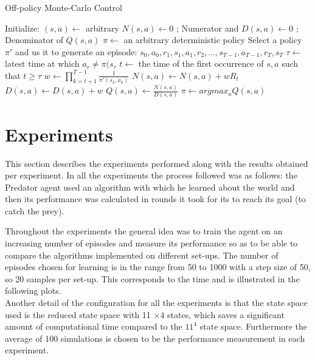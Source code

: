 \documentclass[11pt]{article}
\begin{document}
\begin{algorithm}
\caption{Off-policy Monte-Carlo Control}
\begin{algorithmic}[1]
\label{offpmc}
\STATE Initialize:
\STATE $(s,a) \leftarrow$ arbitrary
\STATE $N(s,a) \leftarrow 0$ \hspace{20mm} ; Numerator and
\STATE $D(s,a) \leftarrow 0$ \hspace{20mm} ; Denominator of $Q(s,a)$
\STATE $\pi \leftarrow$ an arbitrary deterministic policy
\LOOP
\STATE Select a policy $\pi'$ and us it to generate an episode:
\STATE \hspace{20mm} $s_0,a_0,r_1,s_1,a_1,r_2,...,s_{T-1},a_{T-1},r_T,s_T$
\STATE $\tau \leftarrow $ latest time at which $a_r \neq \pi(s_{\tau}$
\STATE $t \leftarrow$ the time of the first occurrence of $s,a$ such that $t \ge \tau$
\STATE $w \leftarrow \prod_{k=t+1}^{T-1} \frac{1}{\pi'(s_k,a_k)}$
\STATE $N(s,a) \leftarrow N(s,a) + wR_t$
\STATE $D(s,a) \leftarrow D(s,a) + w$
\STATE $Q(s,a) \leftarrow \frac{N(s,a)}{D(s,a)}$
\ENDFOR
{}
\STATE $\pi \leftarrow argmax_aQ(s,a)$
\ENDFOR
\ENDLOOP
\ENDFOR
\end{algorithmic}
\end{algorithm}

\section{Experiments}
This section describes the experiments performed along with the results obtained per experiment. In all the experiments the process followed was as follows: the Predator agent used an algorithm with which he learned about the world and then its performance was calculated in rounds it took for its to reach its goal (to catch the prey).

Throughout the experiments the general idea was to train the agent on an increasing number of episodes and measure its performance so as to be able to compare the algorithms implemented on different set-ups. The number of episodes chosen for learning is in the range from 50 to 1000 with a step size of 50, so 20 samples per set-up. This corresponds to the time and is illustrated in the following plots.\\
Another detail of the configuration for all the experiments is that the state space used is the reduced state space with 11 $\times4$ states, which saves a significant amount of computational time compared to the $11^4$ state space. Furthermore the average  of 100 simulations is chosen to be the performance measurement in each experiment.
\end{document}
